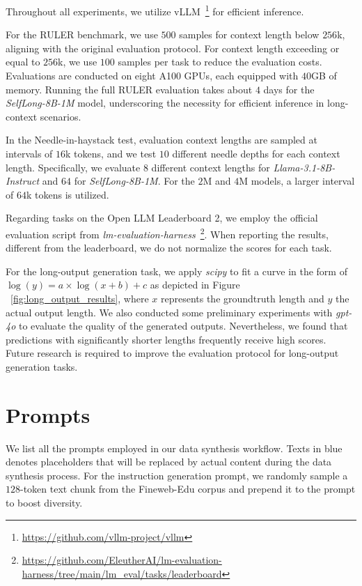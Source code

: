 \documentclass{article}
\begin{document}
Throughout all experiments,
we utilize vLLM~\footnote{\url{https://github.com/vllm-project/vllm}} for efficient inference.

For the RULER benchmark,
we use $500$ samples for context length below $256$k,
aligning with the original evaluation protocol.
For context length exceeding or equal to $256$k,
we use $100$ samples per task to reduce the evaluation costs.
Evaluations are conducted on eight A100 GPUs,
each equipped with $40$GB of memory.
Running the full RULER evaluation takes about $4$ days for the \emph{SelfLong-8B-1M} model,
underscoring the necessity for efficient inference in long-context scenarios.

In the Needle-in-haystack test,
evaluation context lengths are sampled at intervals of $16$k tokens,
and we test $10$ different needle depths for each context length.
Specifically,
we evaluate $8$ different context lengths for \emph{Llama-3.1-8B-Instruct} and $64$ for \emph{SelfLong-8B-1M}.
For the $2$M and $4$M models,
a larger interval of $64$k tokens is utilized.

Regarding tasks on the Open LLM Leaderboard 2,
we employ the official evaluation script from \emph{lm-evaluation-harness}~\footnote{\url{https://github.com/EleutherAI/lm-evaluation-harness/tree/main/lm_eval/tasks/leaderboard}}.
When reporting the results,
different from the leaderboard,
we do not normalize the scores for each task.

For the long-output generation task,
we apply \emph{scipy} to fit a curve in the form of $\log(y) = a \times \log(x + b) + c$ as depicted in Figure ~\ref{fig:long_output_results},
where $x$ represents the groundtruth length and $y$ the actual output length.
We also conducted some preliminary experiments with \emph{gpt-4o} to evaluate the quality of the generated outputs.
Nevertheless,
we found that predictions with significantly shorter lengths frequently receive high scores.
Future research is required to improve the evaluation protocol for long-output generation tasks.

\section{Prompts} \label{sec:app_prompts}
We list all the prompts employed in our data synthesis workflow.
Texts in blue denotes placeholders that will be replaced by actual content during the data synthesis process.
For the instruction generation prompt,
we randomly sample a $128$-token text chunk from the Fineweb-Edu corpus
and prepend it to the prompt to boost diversity.
\end{document}
